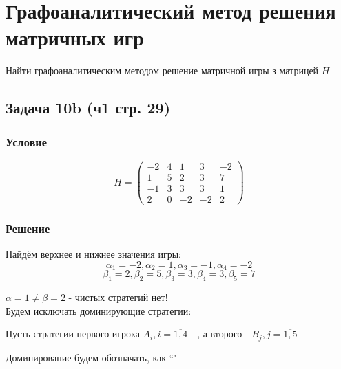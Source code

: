 \documentclass[a4paper,14pt]{extreport}
\newcommand{\quotes}[1]{``#1"}
\begin{document}
\maketitle
\setcounter{page}{2}

\chapter{Графоаналитический метод решения матричных игр}
Найти графоаналитическим методом решение матричной игры з матрицей $H$\par

\section{Задача 10b (ч1 стр. 29)}
\subsection{Условие}
\begin{equation}
    H = \begin{pmatrix} 
            -2 & 4 & 1 & 3 & -2 \\ 
            1 & 5 & 2 & 3 & 7 \\
            -1 & 3 & 3 & 3 & 1 \\
            2 & 0 & -2 & -2 & 2
        \end{pmatrix}
\end{equation}

\subsection{Решение}
Найдём верхнее и нижнее значения игры:
\begin{equation*}
    \alpha_1 = -2, 
    \alpha_2 = 1,
    \alpha_3 = -1,
    \alpha_4 = -2
\end{equation*}
\begin{equation*}
    \beta_1 = 2,
    \beta_2 = 5,
    \beta_3 = 3,
    \beta_4 = 3,
    \beta_5 = 7
\end{equation*}

$ \alpha = 1 \neq \beta = 2 $ - чистых стратегий нет!\\

Будем исключать доминирующие стратегии: \par
Пусть стратегии первого игрока $A_i, i=\overline{1, 4}$ - , а второго - $B_j, j=\overline{1, 5}$ \par
Доминирование будем обозначать, как \quotes{\gg}
\end{document}
